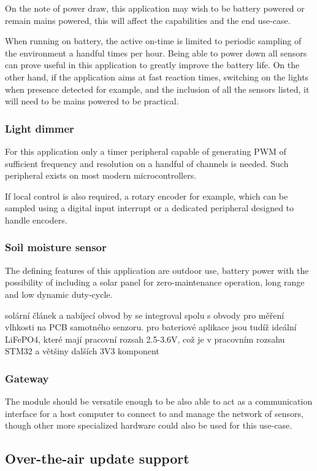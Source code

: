 On the note of power draw, this application may wish to be battery powered or remain mains powered, this will affect the capabilities and the end use-case. 

When running on battery, the active on-time is limited to periodic sampling of the environment a handful times per hour. Being able to power down all sensors can prove useful in this application to greatly improve the battery life. On the other hand, if the application aims at fast reaction times, switching on the lights when presence detected for example, and the inclusion of all the sensors listed, it will need to be mains powered to be practical.

\subsubsection{Light dimmer}
For this application only a timer peripheral capable of generating PWM of sufficient frequency and resolution on a handful of channels is needed. Such peripheral exists on most modern microcontrollers.

If local control is also required, a rotary encoder for example, which can be sampled using a digital input interrupt or a dedicated peripheral designed to handle encoders.

\subsubsection{Soil moisture sensor}
The defining features of this application are outdoor use, battery power with the possibility of including a solar panel for zero-maintenance operation, long range and low dynamic duty-cycle.

solární článek a nabíjecí obvod by se integroval spolu s obvody pro měření vlhkosti na PCB samotného senzoru. pro bateriové aplikace jsou tudíž ideální LiFePO4, které mají pracovní rozsah 2.5-3.6V, což je v pracovním rozsahu STM32 a většiny dalších 3V3 komponent

\subsubsection{Gateway}
The module should be versatile enough to be also able to act as a communication interface for a host computer to connect to and manage the network of sensors, though other more specialized hardware could also be used for this use-case.

\subsection{Over-the-air update support}

